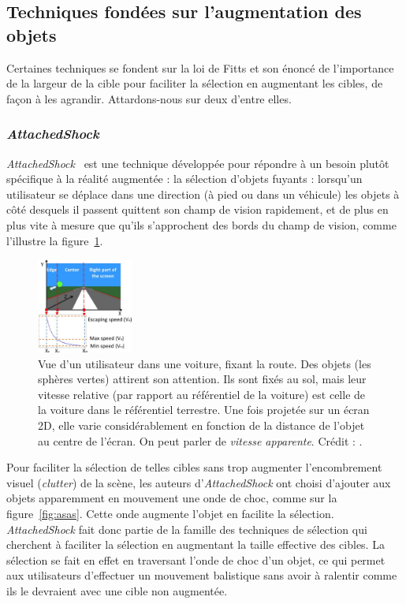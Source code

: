 	\subsection{Techniques fondées sur l'augmentation des objets}
	\label{sub:techAug}
	Certaines techniques se fondent sur la loi de Fitts et son énoncé de l'importance de la largeur de la cible pour faciliter la sélection en augmentant les cibles, de façon à les agrandir. Attardons-nous sur deux d'entre elles.

	\subsubsection{\emph{AttachedShock}}
	\emph{AttachedShock}~\cite{you2012attachedshock, you2014attachedshock} est une technique développée pour répondre à un besoin plutôt spécifique à la réalité augmentée : la sélection d'objets \og fuyants \fg{} : lorsqu'un utilisateur se déplace dans une direction (à pied ou dans un véhicule) les objets à côté desquels il passent quittent son champ de vision rapidement, et de plus en plus vite à mesure que qu'ils s'approchent des bords du champ de vision, comme l'illustre la figure~\ref{fig:as2dspeed}.

	\begin{figure}
		\includegraphics[width=0.28\textwidth]{figures/ch2/as2dspeed}
		\caption[\emph{AttachedShock}, profil de vitesse]{Vue d'un utilisateur dans une voiture, fixant la route. Des objets (les sphères vertes) attirent son attention. Ils sont fixés au sol, mais leur vitesse relative (par rapport au référentiel de la voiture) est celle de la voiture dans le référentiel terrestre. Une fois projetée sur un écran 2D, elle varie considérablement en fonction de la distance de l'objet au centre de l'écran. On peut parler de \emph{vitesse apparente}. Crédit : \cite{you2012attachedshock}.}
		\label{fig:as2dspeed}	
	\end{figure}
	
	Pour faciliter la sélection de telles cibles sans trop augmenter l'encombrement visuel (\emph{clutter}) de la scène, les auteurs d'\emph{AttachedShock} ont choisi d'ajouter aux objets apparemment en mouvement une onde de choc, comme sur la figure~\ref{fig:asas}. Cette onde augmente l'objet en facilite la sélection. \emph{AttachedShock} fait donc partie de la famille des techniques de sélection qui cherchent à faciliter la sélection en augmentant la taille effective des cibles. La sélection se fait en effet en \og traversant \fg{} l'onde de choc d'un objet, ce qui permet aux utilisateurs d'effectuer un mouvement balistique sans avoir à ralentir comme ils le devraient avec une cible non augmentée.
	
